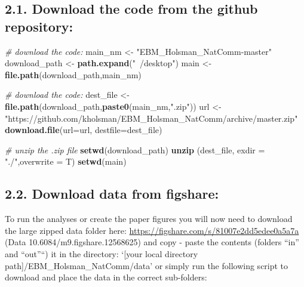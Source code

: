 \documentclass[]{article}
\newenvironment{Shaded}{\begin{snugshade}}{\end{snugshade}}
\newcommand{\KeywordTok}[1]{\textcolor[rgb]{0.13,0.29,0.53}{\textbf{{#1}}}}
\newcommand{\DataTypeTok}[1]{\textcolor[rgb]{0.13,0.29,0.53}{{#1}}}
\newcommand{\StringTok}[1]{\textcolor[rgb]{0.31,0.60,0.02}{{#1}}}
\newcommand{\CommentTok}[1]{\textcolor[rgb]{0.56,0.35,0.01}{\textit{{#1}}}}
\newcommand{\NormalTok}[1]{{#1}}
\begin{document}
\subsection{2.1. Download the code from the github
repository:}\label{download-the-code-from-the-github-repository}

\begin{Shaded}
\begin{Highlighting}[]
    \CommentTok{# download the code:}
    \NormalTok{main_nm       <-}\StringTok{ "EBM_Holsman_NatComm-master"}
    \NormalTok{download_path <-}\StringTok{ }\KeywordTok{path.expand}\NormalTok{(}\StringTok{"~/desktop"}\NormalTok{)}
    \NormalTok{main          <-}\StringTok{ }\KeywordTok{file.path}\NormalTok{(download_path,main_nm)}
   
    \CommentTok{# download the code:}
    \NormalTok{dest_file     <-}\StringTok{ }\KeywordTok{file.path}\NormalTok{(download_path,}\KeywordTok{paste0}\NormalTok{(main_nm,}\StringTok{".zip"}\NormalTok{))}
    \NormalTok{url           <-}\StringTok{"https://github.com/kholsman/EBM_Holsman_NatComm/archive/master.zip"}
    \KeywordTok{download.file}\NormalTok{(}\DataTypeTok{url=}\NormalTok{url, }\DataTypeTok{destfile=}\NormalTok{dest_file)}
    
    \CommentTok{# unzip the .zip file}
    \KeywordTok{setwd}\NormalTok{(download_path)}
    \KeywordTok{unzip} \NormalTok{(dest_file, }\DataTypeTok{exdir =} \StringTok{"./"}\NormalTok{,}\DataTypeTok{overwrite =} \NormalTok{T)}
    \KeywordTok{setwd}\NormalTok{(main)}
\end{Highlighting}
\end{Shaded}

\subsection{2.2. Download data from
figshare:}\label{download-data-from-figshare}

To run the analyses or create the paper figures you will now need to
download the large zipped data folder here:
\url{https://figshare.com/s/81007e2dd5edee0a5a7a} (Data
10.6084/m9.figshare.12568625) and copy - paste the contents (folders
``in'' and ``out''``) it in the directory: `{[}your local directory
path{]}/EBM\_Holsman\_NatComm/data' or simply run the following script
to download and place the data in the correct sub-folders:
\end{document}
